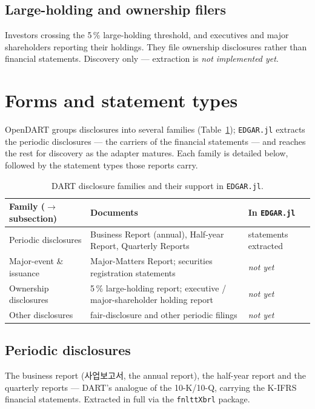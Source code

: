 \documentclass[11pt,a4paper]{report}
\newcommand{\krcjk}[2]{{\cjkKRfont #1}}
\begin{document}
\subsection{Large-holding and ownership filers}
Investors crossing the 5\,\% large-holding threshold, and executives and major shareholders reporting their
holdings. They file ownership disclosures rather than financial statements. Discovery only --- extraction is
\emph{not implemented yet}.

\section{Forms and statement types}\label{sec:dart-forms}

OpenDART groups disclosures into several families (Table~\ref{tab:dart-forms}); \texttt{EDGAR.jl} extracts
the periodic disclosures --- the carriers of the financial statements --- and reaches the rest for discovery
as the adapter matures. Each family is detailed below, followed by the statement types those reports carry.

\begin{table}[h]
\centering
\small
\caption{DART disclosure families and their support in \texttt{EDGAR.jl}.}
\label{tab:dart-forms}
\begin{tabular}{@{}p{}p{}p{}@{}}
\toprule
\textbf{Family ($\to$ subsection)} & \textbf{Documents} & \textbf{In \texttt{EDGAR.jl}} \\
\midrule
Periodic disclosures & Business Report (annual), Half-year Report, Quarterly Reports & statements extracted \\
Major-event \& issuance & Major-Matters Report; securities registration statements & \emph{not yet} \\
Ownership disclosures & 5\,\% large-holding report; executive / major-shareholder holding report & \emph{not yet} \\
Other disclosures & fair-disclosure and other periodic filings & \emph{not yet} \\
\bottomrule
\end{tabular}
\end{table}

\subsection{Periodic disclosures}
The business report (\krcjk{사업보고서}{\emph{saeop bogoseo}}, the annual report), the half-year report and the
quarterly reports --- DART's analogue of the 10-K/10-Q, carrying the K-IFRS financial statements. Extracted
in full via the \texttt{fnlttXbrl} package.
\end{document}
